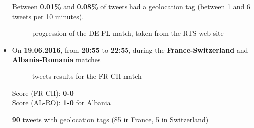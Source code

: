 \documentclass[a4paper,11pt]{report}
\begin{document}
\begin{itemize}
	Between \textbf{0.01\%} and \textbf{0.08\%} of tweets had a geolocation tag (between 1 and 6 tweets per 10 minutes).\\
	\begin{figure}[H]
	\vspace{-5pt}
	\begin{center}
	\vspace{-5pt}
	\caption{progression of the DE-PL match, taken from the RTS web site}
	\end{center}
	\end{figure}
	\vspace{-10pt}
	\newpage
	
	\item On \textbf{19.06.2016}, from \textbf{20:55} to \textbf{22:55}, during the \textbf{France-Switzerland} and \textbf{Albania-Romania} matches
	\begin{figure}[H]
	\vspace{-5pt}
	\begin{center}
	\vspace{-5pt}
	\caption{tweets results for the FR-CH match}
	\end{center}
	\end{figure}
	\vspace{-20pt}
	Score (FR-CH): \textbf{0-0}\\
	Score (AL-RO): \textbf{1-0} for Albania
	
	\textbf{90} tweets with geolocation tags (85 in France, 5 in Switzerland)
	

\end{itemize}
\end{document}
